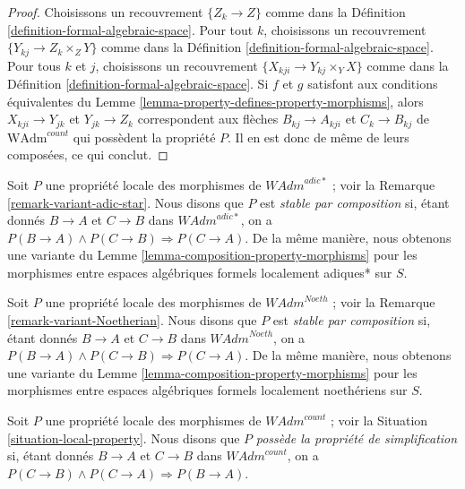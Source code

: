 \begin{proof}
Choisissons un recouvrement $\{Z_k \to Z\}$ comme dans la
Définition \ref{definition-formal-algebraic-space}.
Pour tout $k$, choisissons un recouvrement $\{Y_{kj} \to Z_k \times_Z Y\}$
comme dans la Définition \ref{definition-formal-algebraic-space}.
Pour tous $k$ et $j$, choisissons un recouvrement $\{X_{kji} \to Y_{kj} \times_Y X\}$
comme dans la Définition \ref{definition-formal-algebraic-space}.
Si $f$ et $g$
satisfont aux conditions équivalentes du
Lemme \ref{lemma-property-defines-property-morphisms},
alors $X_{kji} \to Y_{jk}$ et $Y_{jk} \to Z_k$
correspondent aux flèches
$B_{kj} \to A_{kji}$ et $C_k \to B_{kj}$ de
$\text{WAdm}^{count}$ qui possèdent la propriété $P$.
Il en est donc de même de leurs composées, ce qui conclut.
\end{proof}

\begin{remark}
\label{remark-composition-variant-adic-star}
Soit $P$ une propriété locale des morphismes de $\textit{WAdm}^{adic*}$ ; voir la
Remarque \ref{remark-variant-adic-star}. Nous disons que $P$ est {\it stable par
composition} si, étant donnés $B \to A$ et $C \to B$ dans $\textit{WAdm}^{adic*}$,
on a $P(B \to A) \wedge P(C \to B) \Rightarrow P(C \to A)$.
De la même manière, nous obtenons une variante du
Lemme \ref{lemma-composition-property-morphisms}
pour les morphismes entre espaces algébriques formels localement adiques* sur $S$.
\end{remark}

\begin{remark}
\label{remark-composition-variant-Noetherian}
Soit $P$ une propriété locale des morphismes de $\textit{WAdm}^{Noeth}$ ; voir la
Remarque \ref{remark-variant-Noetherian}. Nous disons que $P$ est
{\it stable par composition} si, étant donnés $B \to A$ et $C \to B$
dans $\textit{WAdm}^{Noeth}$, on a
$P(B \to A) \wedge P(C \to B) \Rightarrow P(C \to A)$.
De la même manière, nous obtenons une variante du
Lemme \ref{lemma-composition-property-morphisms}
pour les morphismes entre espaces algébriques formels localement noethériens sur $S$.
\end{remark}

\begin{situation}
\label{situation-permanence-local-property}
Soit $P$ une propriété locale des morphismes de $\textit{WAdm}^{count}$ ; voir la
Situation \ref{situation-local-property}. Nous disons que $P$
{\it possède la propriété de simplification}
si, étant donnés $B \to A$ et $C \to B$ dans $\textit{WAdm}^{count}$,
on a $P(C \to B) \wedge P(C \to A) \Rightarrow P(B \to A)$.
\end{situation}


